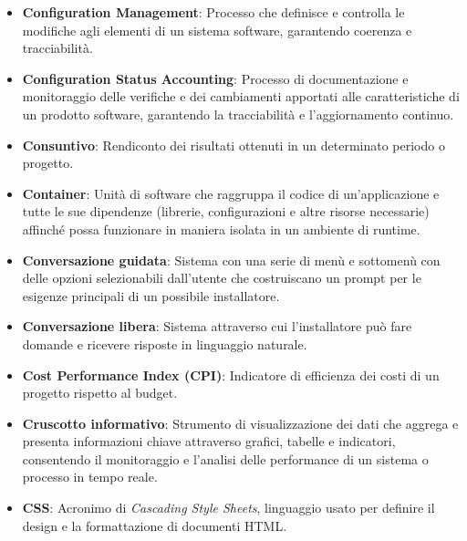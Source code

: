 \begin{itemize}
    \item \textbf{Configuration Management}: Processo che definisce e controlla le modifiche agli elementi di un sistema software, garantendo coerenza e tracciabilità.
    \item \textbf{Configuration Status Accounting}: Processo di documentazione e monitoraggio delle verifiche e dei cambiamenti apportati alle caratteristiche di un prodotto software, garantendo la tracciabilità e l'aggiornamento continuo.
    \item \textbf{Consuntivo}: Rendiconto dei risultati ottenuti in un determinato periodo o progetto.
    \item \textbf{Container}: Unità di software che raggruppa il codice di un'applicazione e tutte le sue dipendenze (librerie, configurazioni e altre risorse necessarie) affinché possa funzionare in maniera isolata in un ambiente di runtime.
    \item \textbf{Conversazione guidata}: Sistema con una serie di menù e sottomenù con delle opzioni selezionabili dall’utente che costruiscano un prompt per le esigenze principali di un possibile installatore.
    \item \textbf{Conversazione libera}: Sistema attraverso cui l’installatore può fare domande e ricevere risposte in linguaggio naturale.
    \item \textbf{Cost Performance Index (CPI)}: Indicatore di efficienza dei costi di un progetto rispetto al budget.
    \item \textbf{Cruscotto informativo}: Strumento di visualizzazione dei dati che aggrega e presenta informazioni chiave attraverso grafici, tabelle e indicatori, consentendo il monitoraggio e l'analisi delle performance di un sistema o processo in tempo reale.
    \item \textbf{CSS}: Acronimo di \textit{Cascading Style Sheets}, linguaggio usato per definire il design e la formattazione di documenti HTML.
    
\end{itemize}
